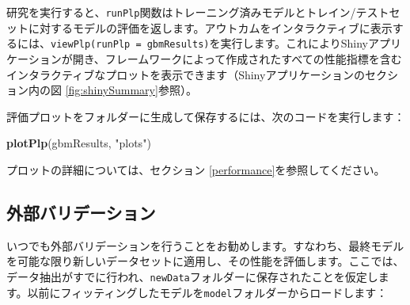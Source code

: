 \documentclass[
  11pt]{book}
\newenvironment{Shaded}{\begin{snugshade}}{\end{snugshade}}
\newcommand{\FunctionTok}[1]{\textcolor[rgb]{0.13,0.29,0.53}{\textbf{#1}}}
\newcommand{\NormalTok}[1]{#1}
\newcommand{\StringTok}[1]{\textcolor[rgb]{0.31,0.60,0.02}{#1}}
\theoremstyle{definition}
\theoremstyle{definition}
\theoremstyle{definition}
\theoremstyle{definition}
\theoremstyle{remark}
\begin{document}
研究を実行すると、\texttt{runPlp}関数はトレーニング済みモデルとトレイン/テストセットに対するモデルの評価を返します。アウトカムをインタラクティブに表示するには、\texttt{viewPlp(runPlp\ =\ gbmResults)}を実行します。これによりShinyアプリケーションが開き、フレームワークによって作成されたすべての性能指標を含むインタラクティブなプロットを表示できます（Shinyアプリケーションのセクション内の図 \ref{fig:shinySummary}参照）。

評価プロットをフォルダーに生成して保存するには、次のコードを実行します：

\begin{Shaded}
\begin{Highlighting}[]
\FunctionTok{plotPlp}\NormalTok{(gbmResults, }\StringTok{"plots"}\NormalTok{)}
\end{Highlighting}
\end{Shaded}

プロットの詳細については、セクション \ref{performance}を参照してください。

\subsection{外部バリデーション}\label{ux5916ux90e8ux30d0ux30eaux30c7ux30fcux30b7ux30e7ux30f3}

いつでも外部バリデーションを行うことをお勧めします。すなわち、最終モデルを可能な限り新しいデータセットに適用し、その性能を評価します。ここでは、データ抽出がすでに行われ、\texttt{newData}フォルダーに保存されたことを仮定します。以前にフィッティングしたモデルを\texttt{model}フォルダーからロードします：
\end{document}
